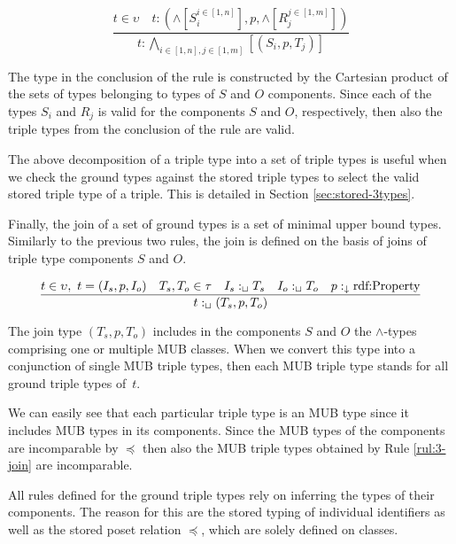 \documentclass[runningheads]{llncs}
\newcommand{\darr}{\downarrow}
\newcommand{\memo}[1]{}
\begin{document}
\begin{equation}
\label{rul:3-land-transform}
\dfrac{t\in\upsilon\quad t:(\land[S_i^{i\in[1,n]}],p,\land[R_j^{j\in[1,m]}])}
      {t:\bigwedge_{i\in[1,n], j\in[1,m]}[(S_i,p,T_j)]}
\end{equation}

The type in the conclusion of the rule is constructed by the Cartesian
product of the sets of types belonging to types of $S$ and $O$
components. Since each of the types $S_i$ and $R_j$ is valid for the
components $S$ and $O$, respectively, then also the triple types from
the conclusion of the rule are valid.

The above decomposition of a triple type into a set of triple types is
useful when we check the ground types against the stored triple types
to select the valid stored triple type of a triple. This is detailed in
Section \ref{sec:stored-3types}.

Finally, the join of a set of ground types is a set of minimal upper
bound types. Similarly to the previous two rules, the join is defined
on the basis of joins of triple type components $S$ and $O$.

\begin{equation}
\label{rul:3-join}
\dfrac{t\in\upsilon,\ t=(I_s,p,I_o)\quad T_s,T_o\in\tau\quad I_s:_\sqcup\/T_s\quad I_o:_\sqcup\/T_o\quad p:_\darr\text{rdf:Property}}
      {t:_\sqcup\/(T_s,p,T_o)}
\end{equation}

The join type $(T_s,p,T_o)$ includes in the components $S$ and $O$ the
$\land$-types comprising one or multiple MUB classes. When we convert
this type into a conjunction of single MUB triple types, then each MUB
triple type stands for all ground triple types of~$t$.

We can easily see that each particular triple type is an MUB type
since it includes MUB types in its components. Since the MUB types of
the components are incomparable by $\preceq$ then also the MUB triple
types obtained by Rule \ref{rul:3-join} are incomparable.

All rules defined for the ground triple types rely on inferring the
types of their components. The reason for this are the stored typing
of individual identifiers as well as the stored poset relation
$\preceq$, which are solely defined on classes.




\memo{The types of $s$ and $o$ can be any classes $T_s$ and $T_o$ from
  ${\cal I}_c$, while the type of $p$ has to be a class $T_p$ that is
  a subclass of rdf:Property. The typing of a triple $t$ is correct
  since the interpretation of $T$ includes $t$.}
\end{document}

